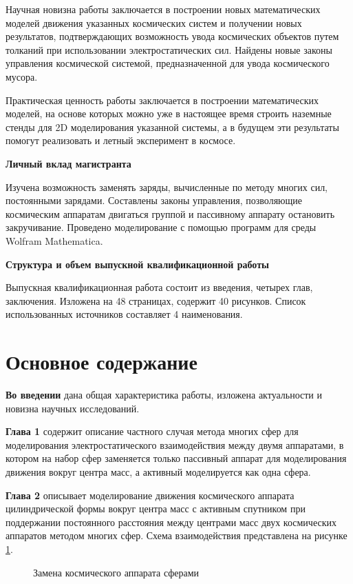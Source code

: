 Научная новизна работы заключается в построении новых математических моделей движения указанных космических систем и получении новых результатов, подтверждающих возможность увода космических объектов путем толканий при использовании электростатических сил. Найдены новые законы управления космической системой, предназначенной для увода космического мусора.

Практическая ценность работы заключается в построении математических моделей, на основе которых можно уже в настоящее время строить наземные стенды для 2D моделирования указанной системы, а в будущем эти результаты помогут реализовать и летный эксперимент в космосе.

\textbf{Личный вклад магистранта}

Изучена возможность заменять заряды, вычисленные по методу многих сил, постоянными зарядами. Составлены законы управления, позволяющие космическим аппаратам двигаться группой и пассивному аппарату остановить закручивание. Проведено моделирование с помощью программ для среды Wolfram Mathematica.

\textbf{Структура и объем выпускной квалификационной работы}

Выпускная квалификационная работа состоит из введения, четырех глав, заключения. Изложена на 48 страницах, содержит 40 рисунков. Список использованных источников составляет 4 наименования.

\section*{Основное содержание}

\textbf{Во введении} дана общая характеристика работы, изложена актуальности и новизна научных исследований.

\textbf{Глава 1} содержит описание частного случая метода многих сфер для моделирования электростатического взаимодействия между двумя аппаратами, в котором на набор сфер заменяется только пассивный аппарат для моделирования движения вокруг центра масс, а активный моделируется как одна сфера.

\textbf{Глава 2} описывает моделирование движения космического аппарата цилиндрической формы вокруг центра масс с активным спутником при поддержании постоянного расстояния между центрами масс двух космических аппаратов методом многих сфер.
Схема взаимодействия представлена на рисунке \ref{ris:3sph}.

\begin{figure}[H]
	\caption{Замена космического аппарата сферами}
	\label{ris:3sph}
\end{figure} 

